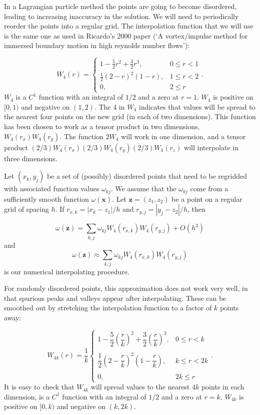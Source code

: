 \documentclass[12pt]{article}
\newcommand{\bx}{{\mathbf x}}
\newcommand{\bz}{{\mathbf z}}
\begin{document}
	
	In a Lagrangian particle method the points are going to become disordered, leading to increasing inaccuracy in the solution. We will need to periodically reorder the points into a regular grid. The interpolation function that we will use is the same one as used in Ricardo's 2000 paper (`A vortex/impulse method for immersed boundary motion in high reynolds number flows'): 
	
	\[ W_4(r) = \left\{ \begin{array}{cr} 1 - \frac{5}{2}r^2 + \frac{3}{2} r^3, & 0 \leq r < 1 \\ \frac{1}{2} \left(2 - r \right)^2 (1-r), & 1 \leq r < 2 \\ 0, & 2 \leq r \end{array} \right. . \]
	$W_4$ is a $C^1$ function with an integral of $1/2$ and a zero at $r=1$. $W_4$ is positive on $[0,1)$ and negative on $(1,2)$. The 4 in $W_4$ indicates that values will be spread to the nearest four points on the new grid (in each of two dimensions). This function has been chosen to work as a tensor product in two dimensions, $W_4(r_x)W_4(r_y)$. The function $2W_4$ will work in one dimension, and a tensor product $(2/3) W_4(r_x)(2/3) W_4(r_y)(2/3) W_4(r_z)$ will interpolate in three dimensions.
	
	Let $(x_k,y_j)$ be a set of (possibly) disordered points that need to be regridded with associated function values $\omega_{kj}$. We assume that the $\omega_{kj}$ come from a sufficiently smooth function $\omega(\bx)$. Let $\bz = (z_1,z_2)$ be a point on a regular grid of spacing $h$. If $r_{x,k} = |x_k - z_1|/h$ and $r_{y,j}= |y_j - z_2|/h$, then 
	
	\[ \omega(\bz) = \sum\limits_{k,j} \omega_{kj} W_4(r_{x,k})W_4(r_{y,j}) + O(h^3) \]
	and 
	\[ \omega(\bz) \approx \sum\limits_{k,j} \omega_{kj} W_4(r_{x,k})W_4(r_{y,j}) \]
	is our numerical interpolating procedure.
	
	For randomly disordered points, this approximation does not work very well, in that spurious peaks and valleys appear after interpolating. These can be smoothed out by stretching the interpolation function to a factor of $k$ points away: 

	\[ W_{4k}(r) = \dfrac{1}{k}\left\{ \begin{array}{cr} 1 - \dfrac{5}{2}\left(\dfrac{r}{k}\right)^2 + \dfrac{3}{2} \left(\dfrac{r}{k}\right)^3, & 0 \leq r < k \\ &
	 \\ \dfrac{1}{2} \left(2 - \dfrac{r}{k} \right)^2 \left(1-\dfrac{r}{k} \right), & k \leq r < 2k \\ & \\ 0, & 2k \leq r \end{array} \right. . \]
% 
	It is easy to check that $W_{4k}$ will spread values to the nearest $4k$ points in each dimension, is a $C^1$ function with an integral of $1/2$ and a zero at $r=k$. $W_{4k}$ is positive on $[0,k)$ and negative on $(k,2k)$.
	
\end{document}
